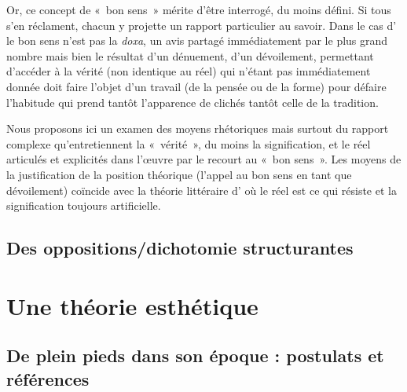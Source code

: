 \documentclass[12pt, a4paper]{article}
\begin{document}
Or, ce concept de «~bon sens~» mérite d'être interrogé, du moins défini. Si tous s'en réclament, chacun y projette un rapport particulier au savoir. Dans le cas d'\robbe{} le bon sens n'est pas la \textit{doxa}, un avis partagé immédiatement par le plus grand nombre mais bien le résultat d'un dénuement, d'un dévoilement, permettant d'accéder à la vérité (non identique au réel) qui n'étant pas immédiatement donnée doit faire l'objet d'un travail (de la pensée ou de la forme) pour défaire l'habitude qui prend tantôt l'apparence de clichés tantôt celle de la tradition.

Nous proposons ici un examen des moyens rhétoriques mais surtout du rapport complexe qu'entretiennent la «~vérité~», du moins la signification, et le réel articulés et explicités dans l'œuvre par le recourt au «~bon sens~». Les moyens de la justification de la position théorique (l'appel au bon sens en tant que dévoilement) coïncide avec la théorie littéraire d'\robbe{} où le réel est ce qui résiste et la signification toujours artificielle.



\subsection{Des oppositions/dichotomie structurantes}




\newpage

\section{Une théorie esthétique}

\subsection{De plein pieds dans son époque : postulats et références}
\end{document}
